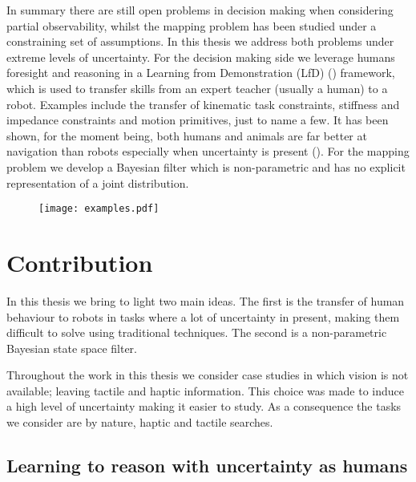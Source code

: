 In summary there are still open problems in decision making when considering partial observability, whilst 
the mapping problem has been studied under a constraining set of assumptions. In this thesis we address both problems 
under extreme levels of uncertainty. 
For the decision making side we leverage humans foresight and reasoning in a Learning from Demonstration (LfD) (\cite{Billard08chapter})
framework, which is used to transfer skills from an expert teacher (usually a human) to a robot. Examples include the transfer of 
kinematic task constraints, stiffness and impedance constraints and motion primitives, just to name a few.
It has been shown, for the moment being, both humans and animals are far better at navigation than robots especially when 
uncertainty is present (\cite{stankiewicz2006lost}). For the mapping problem we develop a Bayesian filter which is non-parametric 
and has no explicit representation of a joint distribution.

\begin{figure}
 \centering
 \texttt{[image: examples.pdf]}
\end{figure}



\section{Contribution}

In this thesis we bring to light two main ideas. The first is the transfer of human behaviour to robots
in tasks where a lot of uncertainty in present, making them difficult to solve using traditional techniques.
The second is a non-parametric Bayesian state space filter.

Throughout the work in this thesis we consider case studies in which vision is not available; leaving tactile and 
haptic information. This choice was made to induce a high level of uncertainty making it easier to study. As 
a consequence the tasks we consider are by nature, haptic and tactile searches.

\subsection{Learning to reason with uncertainty as humans}

